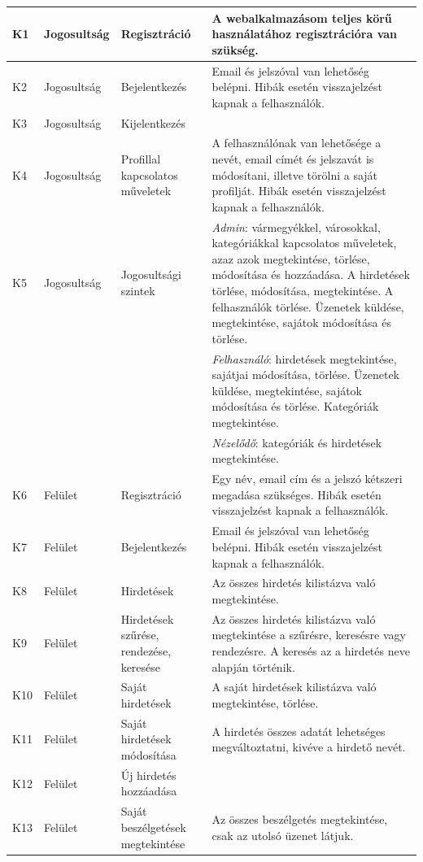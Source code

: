 \documentclass[]{thesis-ekf}
\theoremstyle{definition}
\theoremstyle{remark}
\begin{document}
\begin{longtable}{|l|l|p{3cm}|p{8cm}|}
				K1 & Jogosultság & Regisztráció & A webalkalmazásom teljes körű használatához regisztrációra van szükség. \\ \hline
				K2 & Jogosultság & Bejelentkezés & Email és jelszóval van lehetőség belépni. Hibák esetén visszajelzést kapnak a felhasználók. \\ \hline
				K3 & Jogosultság & Kijelentkezés & \\ \hline
				K4 & Jogosultság & Profillal kapcsolatos műveletek & A felhasználónak van lehetősége a nevét, email címét és jelszavát is módosítani, illetve törölni a saját profilját. Hibák esetén visszajelzést kapnak a felhasználók. \\ \hline
				K5 & Jogosultság & Jogosultsági szintek & \emph{Admin}: vármegyékkel, városokkal, kategóriákkal kapcsolatos műveletek, azaz azok megtekintése, törlése, módosítása és hozzáadása. A hirdetések törlése, módosítása, megtekintése. A felhasználók törlése. Üzenetek küldése, megtekintése, sajátok módosítása és törlése. \\ 
				& & & \emph{Felhasználó}: hirdetések megtekintése, sajátjai módosítása, törlése. Üzenetek küldése, megtekintése, sajátok módosítása és törlése. Kategóriák megtekintése. \\ 
				& & & \emph{Nézelődő}: kategóriák és hirdetések megtekintése. \\ \hline
				K6 & Felület & Regisztráció & Egy név, email cím és a jelszó kétszeri megadása szükséges. Hibák esetén visszajelzést kapnak a felhasználók. \\ \hline
				K7 & Felület & Bejelentkezés & Email és jelszóval van lehetőség belépni. Hibák esetén visszajelzést kapnak a felhasználók. \\ \hline
				K8 & Felület & Hirdetések & Az összes hirdetés kilistázva való megtekintése. \\ \hline
				K9 & Felület & Hirdetések szűrése, rendezése, keresése & Az összes hirdetés kilistázva való megtekintése a szűrésre, keresésre vagy rendezésre. A keresés az a hirdetés neve alapján történik. \\ \hline
				K10 & Felület & Saját hirdetések & A saját hirdetések kilistázva való megtekintése, törlése. \\ \hline
				K11 & Felület & Saját hirdetések módosítása & A hirdetés összes adatát lehetséges megváltoztatni, kivéve a hirdető nevét. \\ \hline
				K12 & Felület & Új hirdetés hozzáadása & ~ \\ \hline
				K13 & Felület & Saját beszélgetések megtekintése & Az összes beszélgetés megtekintése, csak az utolsó üzenet látjuk. \\ \hline

\end{longtable}
\end{document}
